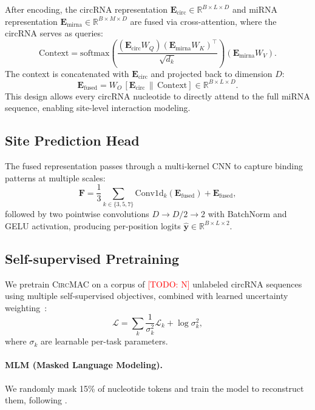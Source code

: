 \documentclass[10pt,twocolumn]{article}
\newcommand{\todo}[1]{\textcolor{red}{[TODO: #1]}}
\newcommand{\circmac}{\textsc{CircMAC}}
\begin{document}
After encoding, the circRNA representation
$\mathbf{E}_{\text{circ}} \in \mathbb{R}^{B \times L \times D}$ and
miRNA representation $\mathbf{E}_{\text{mirna}} \in \mathbb{R}^{B \times M \times D}$
are fused via cross-attention, where the circRNA serves as queries:
\begin{equation}
  \text{Context} = \text{softmax}\!\left(
    \frac{(\mathbf{E}_{\text{circ}} W_Q)(\mathbf{E}_{\text{mirna}} W_K)^\top}{\sqrt{d_k}}
  \right) (\mathbf{E}_{\text{mirna}} W_V).
\end{equation}
The context is concatenated with $\mathbf{E}_{\text{circ}}$ and
projected back to dimension $D$:
\begin{equation}
  \mathbf{E}_{\text{fused}}
    = W_O \,[\mathbf{E}_{\text{circ}}\,\|\,\text{Context}]
    \in \mathbb{R}^{B \times L \times D}.
\end{equation}
This design allows every circRNA nucleotide to directly attend to the
full miRNA sequence, enabling site-level interaction modeling.

\subsection{Site Prediction Head}

The fused representation passes through a multi-kernel CNN to capture
binding patterns at multiple scales:
\begin{equation}
  \mathbf{F} = \frac{1}{3}\sum_{k \in \{3,5,7\}}
    \text{Conv1d}_k(\mathbf{E}_{\text{fused}}) + \mathbf{E}_{\text{fused}},
\end{equation}
followed by two pointwise convolutions
$D \to D/2 \to 2$ with BatchNorm and GELU activation, producing
per-position logits $\hat{\mathbf{y}} \in \mathbb{R}^{B \times L \times 2}$.

\subsection{Self-supervised Pretraining}
\label{sec:pretrain}

We pretrain \circmac{} on a corpus of \todo{N} unlabeled circRNA
sequences using multiple self-supervised objectives, combined with
learned uncertainty weighting~\cite{kendall2018multi}:
\begin{equation}
  \mathcal{L} = \sum_k \frac{1}{\sigma_k^2} \mathcal{L}_k + \log \sigma_k^2,
\end{equation}
where $\sigma_k$ are learnable per-task parameters.

\paragraph{MLM (Masked Language Modeling).}
We randomly mask 15\% of nucleotide tokens and train the model to
reconstruct them, following \citet{devlin2019bert}.
\end{document}
